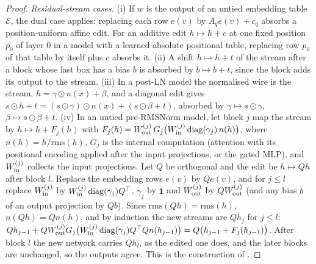 \begin{proof}
\emph{Residual-stream cases.} (i) If $w$ is the output of an untied embedding table $\mathcal E$, the dual case applies:
replacing each row $e(v)$ by $A_qe(v)+c_q$ absorbs a position-uniform affine edit. For an additive edit $h\mapsto h+c$ at one
fixed position $p_0$ of layer $0$ in a model with a learned absolute positional table, replacing row $p_0$ of that table by
itself plus $c$ absorbs it. (ii) A shift $h\mapsto h+t$ of the stream after a block whose last box has a bias $b$ is absorbed
by $b\mapsto b+t$, since the block adds its output to the stream. (iii) In a post-LN model the normalised wire is the stream,
$h=\gamma\odot n(x)+\beta$, and a diagonal edit gives $s\odot h+t=(s\odot\gamma)\odot n(x)+(s\odot\beta+t)$, absorbed by
$\gamma\mapsto s\odot\gamma$, $\beta\mapsto s\odot\beta+t$. (iv) In an untied pre-RMSNorm model, let block $j$ map the stream by
$h\mapsto h+F_j(h)$ with $F_j(h)=W^{(j)}_{\rm out}\,G_j\big(W^{(j)}_{\rm in}\operatorname{diag}(\gamma_j)\,n(h)\big)$, where $n(h)=h/\mathrm{rms}(h)$,
$G_j$ is the internal computation (attention with its positional encoding applied after the input projections, or the gated
MLP), and $W^{(j)}_{\rm in}$ collects the input projections. Let $Q$ be orthogonal and the edit be $h\mapsto Qh$ after block
$l$. Replace the embedding rows $e(v)$ by $Qe(v)$, and for $j\le l$ replace $W^{(j)}_{\rm in}$ by $W^{(j)}_{\rm in}\operatorname{diag}(\gamma_j)Q^{\top}$,
$\gamma_j$ by $\mathbf 1$ and $W^{(j)}_{\rm out}$ by $QW^{(j)}_{\rm out}$ (and any bias $b$ of an output projection by $Qb$). Since
$\mathrm{rms}(Qh)=\mathrm{rms}(h)$, $n(Qh)=Qn(h)$, and by induction the new streams are $Qh_j$ for $j\le l$:
$Qh_{j-1}+QW^{(j)}_{\rm out}G_j\big(W^{(j)}_{\rm in}\operatorname{diag}(\gamma_j)Q^{\top} Qn(h_{j-1})\big)=Q\big(h_{j-1}+F_j(h_{j-1})\big)$. After block $l$
the new network carries $Qh_l$, as the edited one does, and the later blocks are unchanged, so the outputs agree. This is the
construction of \citet{xashkboos2024slicegpt,xashkboos2024quarot}.


\end{proof}
